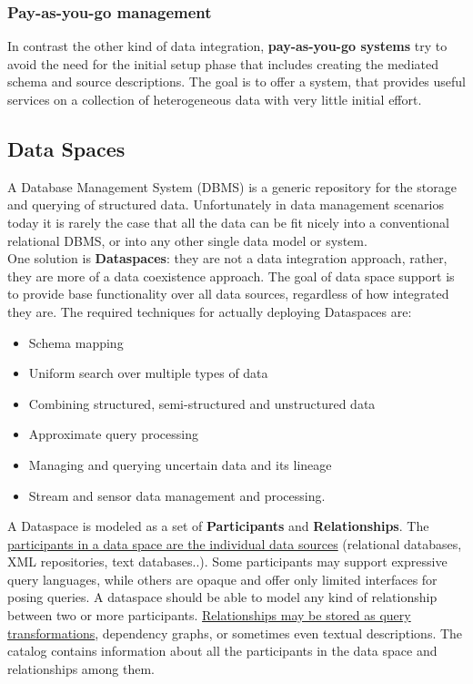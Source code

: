 \documentclass[10pt,a4paper]{article}
\begin{document}
\subsubsection{Pay-as-you-go management}
In contrast the other kind of data integration, \textbf{pay-as-you-go systems} try to avoid the need for the initial setup phase that includes creating the mediated schema and source descriptions. The goal is to offer a system, that provides useful services on a collection of heterogeneous data with very little initial effort.
\subsection{Data Spaces}
A Database Management System (DBMS) is a generic repository for the storage and querying of structured data. Unfortunately in data management scenarios today it is rarely the case that all the data can be fit nicely into a conventional relational DBMS, or into any other single data model or system. \\
One solution is \textbf{Dataspaces}: they are not a data integration approach, rather, they are more of a data coexistence approach. The goal of data space support is to provide base functionality over all data sources, regardless of how integrated they are.
The required techniques for actually deploying Dataspaces are:
\begin{itemize}
	\item Schema mapping
	\item Uniform search over multiple types of data
	\item Combining structured, semi-structured and unstructured data
	\item Approximate query processing
	\item Managing and querying uncertain data and its lineage
	\item Stream and sensor data management and processing.
\end{itemize}
A Dataspace is modeled as a set of \textbf{Participants} and \textbf{Relationships}. The \uline{participants in a data space are the individual data sources} (relational databases, XML repositories, text databases..). Some participants may support expressive query languages, while others are opaque and offer only limited interfaces for posing queries. A dataspace should be able to model any kind of relationship between two or more participants. \uline{Relationships may be stored as query transformations}, dependency graphs, or sometimes even textual descriptions. The catalog contains information about all the participants in the data space and relationships among them.
\end{document}
